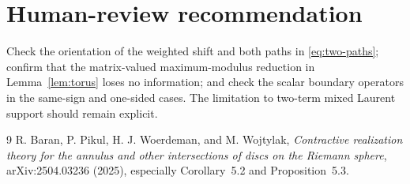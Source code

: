 \documentclass[11pt]{article}
\begin{document}
\section*{Human-review recommendation}

Check the orientation of the weighted shift and both paths in
\eqref{eq:two-paths}; confirm that the matrix-valued maximum-modulus reduction
in Lemma~\ref{lem:torus} loses no information; and check the scalar boundary
operators in the same-sign and one-sided cases.  The limitation to two-term
mixed Laurent support should remain explicit.

\begin{thebibliography}{9}
R. Baran, P. Pikul, H. J. Woerdeman, and M. Wojtylak,
\emph{Contractive realization theory for the annulus and other intersections
of discs on the Riemann sphere}, arXiv:2504.03236 (2025), especially
Corollary~5.2 and Proposition~5.3.
\end{thebibliography}
\end{document}
